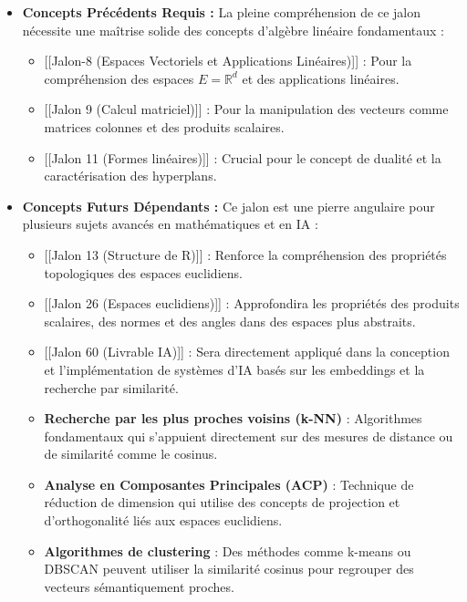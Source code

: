 \documentclass[11pt,a4paper]{report}
\begin{document}
\begin{itemize}

\item
  \textbf{Concepts Précédents Requis :} La pleine compréhension de ce
  jalon nécessite une maîtrise solide des concepts d'algèbre linéaire
  fondamentaux :

  \begin{itemize}

  \item
    {[}{[}Jalon-8 (Espaces Vectoriels et Applications Linéaires){]}{]} :
    Pour la compréhension des espaces \(E=\mathbb{R}^d\) et des
    applications linéaires.
  \item
    {[}{[}Jalon 9 (Calcul matriciel){]}{]} : Pour la manipulation des
    vecteurs comme matrices colonnes et des produits scalaires.
  \item
    {[}{[}Jalon 11 (Formes linéaires){]}{]} : Crucial pour le concept de
    dualité et la caractérisation des hyperplans.
  \end{itemize}
\item
  \textbf{Concepts Futurs Dépendants :} Ce jalon est une pierre
  angulaire pour plusieurs sujets avancés en mathématiques et en IA :

  \begin{itemize}

  \item
    {[}{[}Jalon 13 (Structure de R){]}{]} : Renforce la compréhension
    des propriétés topologiques des espaces euclidiens.
  \item
    {[}{[}Jalon 26 (Espaces euclidiens){]}{]} : Approfondira les
    propriétés des produits scalaires, des normes et des angles dans des
    espaces plus abstraits.
  \item
    {[}{[}Jalon 60 (Livrable IA){]}{]} : Sera directement appliqué dans
    la conception et l'implémentation de systèmes d'IA basés sur les
    embeddings et la recherche par similarité.
  \item
    \textbf{Recherche par les plus proches voisins (k-NN)} : Algorithmes
    fondamentaux qui s'appuient directement sur des mesures de distance
    ou de similarité comme le cosinus.
  \item
    \textbf{Analyse en Composantes Principales (ACP)} : Technique de
    réduction de dimension qui utilise des concepts de projection et
    d'orthogonalité liés aux espaces euclidiens.
  \item
    \textbf{Algorithmes de clustering} : Des méthodes comme k-means ou
    DBSCAN peuvent utiliser la similarité cosinus pour regrouper des
    vecteurs sémantiquement proches.
  \end{itemize}
\end{itemize}
\end{document}
